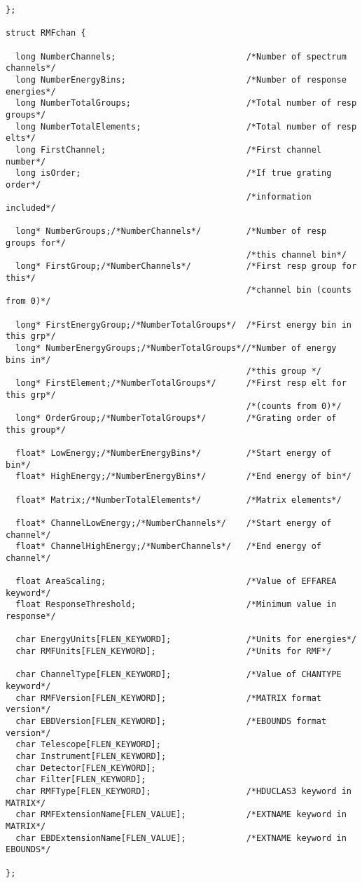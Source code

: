 \documentclass[11pt]{book}
\begin{document}
\begin{verbatim}
};

struct RMFchan {

  long NumberChannels;                          /*Number of spectrum channels*/
  long NumberEnergyBins;                        /*Number of response energies*/
  long NumberTotalGroups;                       /*Total number of resp groups*/
  long NumberTotalElements;                     /*Total number of resp elts*/
  long FirstChannel;                            /*First channel number*/
  long isOrder;                                 /*If true grating order*/
                                                /*information included*/

  long* NumberGroups;/*NumberChannels*/         /*Number of resp groups for*/
                                                /*this channel bin*/
  long* FirstGroup;/*NumberChannels*/           /*First resp group for this*/
                                                /*channel bin (counts from 0)*/

  long* FirstEnergyGroup;/*NumberTotalGroups*/  /*First energy bin in this grp*/
  long* NumberEnergyGroups;/*NumberTotalGroups*//*Number of energy bins in*/
                                                /*this group */
  long* FirstElement;/*NumberTotalGroups*/      /*First resp elt for this grp*/
                                                /*(counts from 0)*/
  long* OrderGroup;/*NumberTotalGroups*/        /*Grating order of this group*/

  float* LowEnergy;/*NumberEnergyBins*/         /*Start energy of bin*/
  float* HighEnergy;/*NumberEnergyBins*/        /*End energy of bin*/

  float* Matrix;/*NumberTotalElements*/         /*Matrix elements*/

  float* ChannelLowEnergy;/*NumberChannels*/    /*Start energy of channel*/
  float* ChannelHighEnergy;/*NumberChannels*/   /*End energy of channel*/

  float AreaScaling;                            /*Value of EFFAREA keyword*/
  float ResponseThreshold;                      /*Minimum value in response*/

  char EnergyUnits[FLEN_KEYWORD];               /*Units for energies*/
  char RMFUnits[FLEN_KEYWORD];                  /*Units for RMF*/

  char ChannelType[FLEN_KEYWORD];               /*Value of CHANTYPE keyword*/
  char RMFVersion[FLEN_KEYWORD];                /*MATRIX format version*/
  char EBDVersion[FLEN_KEYWORD];                /*EBOUNDS format version*/
  char Telescope[FLEN_KEYWORD];                             
  char Instrument[FLEN_KEYWORD];
  char Detector[FLEN_KEYWORD];
  char Filter[FLEN_KEYWORD];
  char RMFType[FLEN_KEYWORD];                   /*HDUCLAS3 keyword in MATRIX*/
  char RMFExtensionName[FLEN_VALUE];            /*EXTNAME keyword in MATRIX*/
  char EBDExtensionName[FLEN_VALUE];            /*EXTNAME keyword in EBOUNDS*/

};

\end{verbatim}
\end{document}
